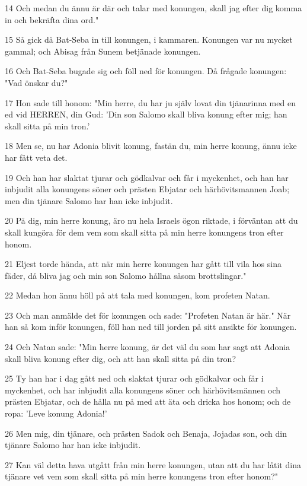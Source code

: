 \par 14 Och medan du ännu är där och talar med konungen, skall jag efter dig komma in och bekräfta dina ord."
\par 15 Så gick då Bat-Seba in till konungen, i kammaren. Konungen var nu mycket gammal; och Abisag från Sunem betjänade konungen.
\par 16 Och Bat-Seba bugade sig och föll ned för konungen. Då frågade konungen: "Vad önskar du?"
\par 17 Hon sade till honom: "Min herre, du har ju själv lovat din tjänarinna med en ed vid HERREN, din Gud: 'Din son Salomo skall bliva konung efter mig; han skall sitta på min tron.'
\par 18 Men se, nu har Adonia blivit konung, fastän du, min herre konung, ännu icke har fått veta det.
\par 19 Och han har slaktat tjurar och gödkalvar och får i myckenhet, och han har inbjudit alla konungens söner och prästen Ebjatar och härhövitsmannen Joab; men din tjänare Salomo har han icke inbjudit.
\par 20 På dig, min herre konung, äro nu hela Israels ögon riktade, i förväntan att du skall kungöra för dem vem som skall sitta på min herre konungens tron efter honom.
\par 21 Eljest torde hända, att när min herre konungen har gått till vila hos sina fäder, då bliva jag och min son Salomo hållna såsom brottslingar."
\par 22 Medan hon ännu höll på att tala med konungen, kom profeten Natan.
\par 23 Och man anmälde det för konungen och sade: "Profeten Natan är här." När han så kom inför konungen, föll han ned till jorden på sitt ansikte för konungen.
\par 24 Och Natan sade: "Min herre konung, är det väl du som har sagt att Adonia skall bliva konung efter dig, och att han skall sitta på din tron?
\par 25 Ty han har i dag gått ned och slaktat tjurar och gödkalvar och får i myckenhet, och har inbjudit alla konungens söner och härhövitsmännen och prästen Ebjatar, och de hålla nu på med att äta och dricka hos honom; och de ropa: 'Leve konung Adonia!'
\par 26 Men mig, din tjänare, och prästen Sadok och Benaja, Jojadas son, och din tjänare Salomo har han icke inbjudit.
\par 27 Kan väl detta hava utgått från min herre konungen, utan att du har låtit dina tjänare vet vem som skall sitta på min herre konungens tron efter honom?"
